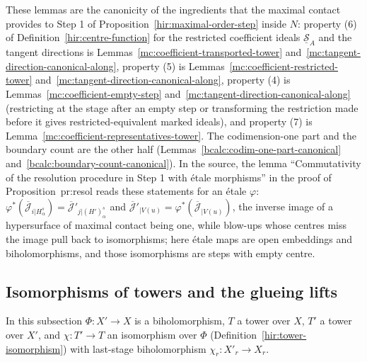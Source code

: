 These lemmas are the canonicity of the ingredients that the maximal contact provides to Step 1 of Proposition~\ref{hir:maximal-order-step} inside \(N\): property (6) of
Definition~\ref{hir:centre-function} for the restricted coefficient ideals \(\underline{\mathcal S}_A\) and the tangent directions is
Lemmas~\ref{mc:coefficient-transported-tower} and~\ref{mc:tangent-direction-canonical-along}, property (5) is Lemmas~\ref{mc:coefficient-restricted-tower}
and~\ref{mc:tangent-direction-canonical-along}, property (4) is Lemmas~\ref{mc:coefficient-empty-step} and~\ref{mc:tangent-direction-canonical-along} (restricting at the stage
after an empty step or transforming the restriction made before it gives restricted-equivalent marked ideals), and property (7) is
Lemma~\ref{mc:coefficient-representatives-tower}. The codimension-one part and the boundary count are the other half (Lemmas~\ref{bcalc:codim-one-part-canonical}
and~\ref{bcalc:boundary-count-canonical}). In the source, the lemma ``Commutativity of the resolution procedure in Step 1 with étale morphisms'' in the proof of
Proposition~pr:resol reads these statements for an étale \(\varphi\): \(\varphi^*(\overline{\mathcal J}_{i|H^s_\alpha})=\overline{\mathcal J}'_{j|(H')^s_\alpha}\) and
\(\overline{\mathcal J}'_{|V(u)}=\varphi^*(\overline{\mathcal J}_{|V(u)})\), the inverse image of a hypersurface of maximal contact being one, while blow-ups whose centres
miss the image pull back to isomorphisms; here étale maps are open embeddings and biholomorphisms, and those isomorphisms are steps with empty centre.

\subsection{Isomorphisms of towers and the glueing lifts}

In this subsection \(\Phi\colon X'\to X\) is a biholomorphism, \(T\) a tower over \(X\), \(T'\) a tower over \(X'\), and \(\chi\colon T'\to T\) an isomorphism over \(\Phi\)
(Definition~\ref{hir:tower-isomorphism}) with last-stage biholomorphism \(\chi_r\colon X'_r\to X_r\).

